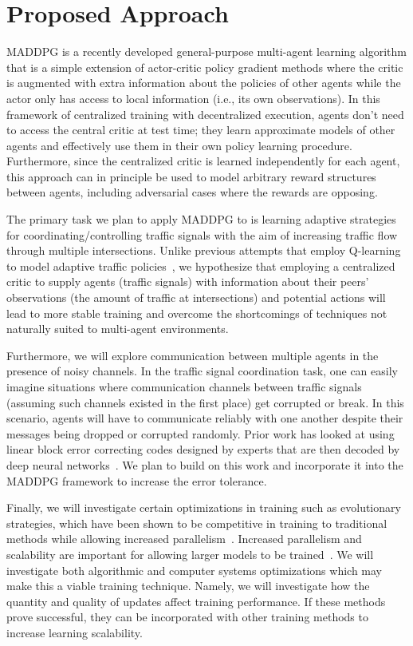 
\section{Proposed Approach}
\label{sec:direction}

MADDPG is a recently developed general-purpose multi-agent learning algorithm
that is a simple extension of actor-critic policy gradient methods where the
critic is augmented with extra information about the policies of other agents
while the actor only has access to local information (i.e., its own
observations). In this framework of centralized training with decentralized
execution, agents don’t need to access the central critic at test time; they
learn approximate models of other agents and effectively use them in their own
policy learning procedure. Furthermore, since the centralized critic is
learned independently for each agent, this approach can in principle be used
to model arbitrary reward structures between agents, including adversarial
cases where the rewards are opposing.

The primary task we plan to apply MADDPG to is learning adaptive strategies
for coordinating/controlling traffic signals with the aim of increasing
traffic flow through multiple intersections. Unlike previous attempts that
employ Q-learning to model adaptive traffic policies~\cite{araghi2015traffic},
we hypothesize that employing a centralized critic to supply agents (traffic
signals) with information about their peers’ observations (the amount of
traffic at intersections) and potential actions will lead to more stable
training and overcome the shortcomings of techniques not naturally suited to
multi-agent environments.

Furthermore, we will explore communication between multiple agents in the
presence of noisy channels. In the traffic signal coordination task, one can
easily imagine situations where communication channels between traffic signals
(assuming such channels existed in the first place) get corrupted or break. In
this scenario, agents will have to communicate reliably with one another
despite their messages being dropped or corrupted randomly. Prior work has
looked at using linear block error correcting codes designed by experts that
are then decoded by deep neural networks~\cite{nachmani2016learning,
nachmani2017rnn}. We plan to build on this work and incorporate it into the
MADDPG framework to increase the error tolerance.

Finally, we will investigate certain optimizations in training such as
evolutionary strategies, which have been shown to be competitive in training
to traditional methods while allowing increased
parallelism~\cite{salimans2017evolution}.
Increased parallelism and scalability are important for allowing larger models to be trained~\cite{nair2015massively}.
We will investigate both algorithmic and computer systems optimizations which may make this a viable training technique.
Namely, we will investigate how the quantity and quality of updates affect training performance.
If these methods prove successful, they can be incorporated with other training methods to increase learning scalability.



